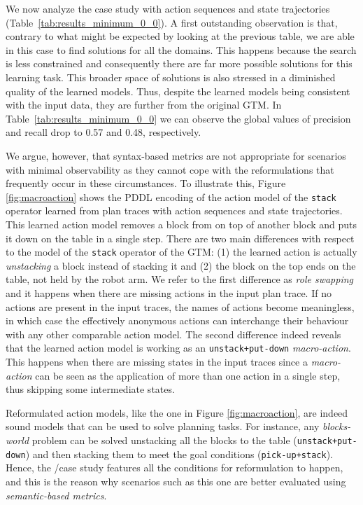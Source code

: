 We now analyze the case study with \NO action sequences and \NO state trajectories (Table~\ref{tab:results_minimum_0_0}). A first outstanding observation is that, contrary to what might be expected by looking at the previous table, we are able in this case to find solutions for all the domains. This happens because the search is less constrained and consequently there are far more possible solutions for this learning task. This broader space of solutions is also stressed in a diminished quality of the learned models. Thus, despite the learned models being consistent with the input data, they are further from the original GTM. In Table~\ref{tab:results_minimum_0_0} we can observe the global values of precision and recall drop to 0.57 and 0.48, respectively.

We argue, however, that syntax-based metrics are not appropriate for scenarios with minimal observability as they cannot cope with the reformulations that frequently occur in these circumstances. To illustrate this, Figure \ref{fig:macroaction} shows the PDDL encoding of the action model of the {\tt\small stack} operator learned from plan traces with \NO action sequences and \NO state trajectories. This learned action model removes a block from on top of another block and puts it down on the table in a single step. There are two main differences with respect to the model of the {\tt\small stack} operator of the GTM: (1) the learned action is actually \emph{unstacking} a block instead of stacking it and (2) the block on the top ends on the table, not held by the robot arm. We refer to the first difference as \emph{role swapping} and it happens when there are missing actions in the input plan trace. If no actions are present in the input traces, the names of actions become meaningless, in which case the effectively anonymous actions can interchange their behaviour with any other comparable action model. The second difference indeed reveals that the learned action model is working as an {\tt\small unstack+put-down} \emph{macro-action}. This happens when there are missing states in the input traces since a \emph{macro-action} can be seen as the application of more than one action in a single step, thus skipping some intermediate states.

Reformulated action models, like the one in Figure \ref{fig:macroaction}, are indeed sound models that can be used to solve planning tasks. For instance, any \emph{blocks-world} problem can be solved unstacking all the blocks to the table ({\tt\small unstack+put-down}) and then stacking them to meet the goal conditions ({\tt\small pick-up+stack}). Hence, the \NO/\NO case study features all the conditions for reformulation to happen, and this is the reason why scenarios such as this one are better evaluated using {\em semantic-based metrics}.


